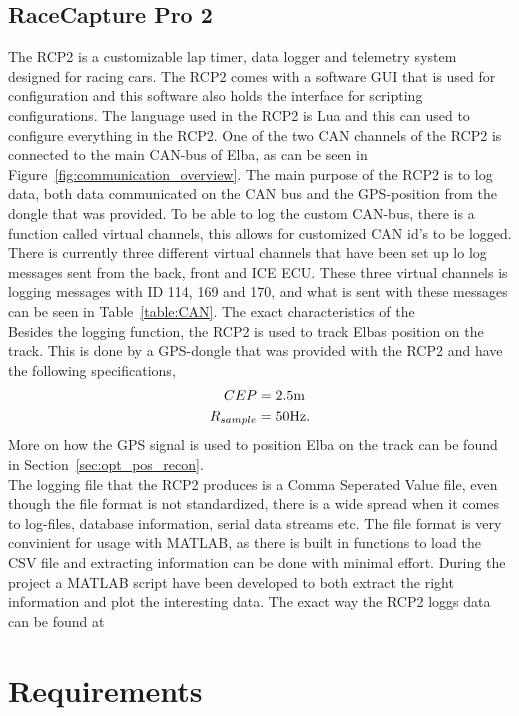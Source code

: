 \subsection{RaceCapture Pro 2}
The RCP2 is a customizable lap timer, data logger and telemetry system designed
for racing cars. The RCP2 comes with a software GUI that is used for
configuration and this software also holds the interface for scripting
configurations.  The language used in the RCP2 is Lua and this can used to
configure everything in the RCP2. One of the two CAN channels of the RCP2 is
connected to the main CAN-bus of Elba, as can be seen in
Figure~\ref{fig:communication_overview}.  The main purpose of the RCP2 is to log
data, both data communicated on the CAN bus and the GPS-position from the dongle that
was provided. To be able to log the custom CAN-bus, there is a function called
virtual channels, this allows for customized CAN id's to be logged. There is
currently three different virtual channels that have been set up lo log messages
sent from the back, front and ICE ECU\@. These three virtual channels is logging
messages with ID 114, 169 and 170, and what is sent with these messages can be
seen in Table~\ref{table:CAN}. The exact characteristics of the \\
Besides the logging function, the RCP2 is used to track Elbas position on the
track. This is done by a GPS-dongle that was provided with the RCP2 and have the
following specifications,
\begin{align}
   CEP&=2.5\textnormal{m}\\
   R_{sample}&=50\textnormal{Hz}.
\end{align}
More on how the GPS signal is used to position Elba on the track can be found in
Section~\ref{sec:opt_pos_recon}.\\
The logging file that the RCP2 produces is a Comma Seperated Value file, even
though the file format is not standardized, there is a wide spread when it
comes to log-files, database information, serial data streams etc.
The file format is very convinient for usage with MATLAB, as there is built in
functions to load the CSV file and extracting information can be done with
minimal effort. During the project a MATLAB script have been developed to both
extract the right information and plot the interesting data. The exact way the
RCP2 loggs data can be found at~\cite{RCP2_log} 

\section{Requirements}
